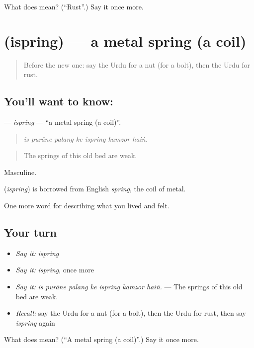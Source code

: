 \begin{tcolorbox}[breakable,colback=teal!4,colframe=teal!35!black,title={Before you move on}]
What does  mean? (\textquotedblleft{}Rust\textquotedblright{}.) Say it once more.
\end{tcolorbox}
\section[\texorpdfstring{\ur{اسپرنگ} (ispring)}{اسپرنگ (ispring)}]{ (ispring) — a metal spring (a coil)}

\label{lesson:UR-C502-ispring}



\begin{quote}
Before the new one: say the Urdu for a nut (for a bolt), then the Urdu for rust.
\end{quote}

\subsection*{You'll want to know: }
\textbf{} — \emph{ispring} — \textquotedblleft{}a metal spring (a coil)\textquotedblright{}.

\begin{quote}
      
\end{quote}

\begin{quote}
\emph{is purāne palang ke ispring kamzor haiṅ.}
\end{quote}

\begin{quote}
The springs of this old bed are weak.
\end{quote}

Masculine.

\begin{cousinweb}
\textbf{} (\emph{ispring}) is borrowed from English \emph{spring}, the coil of metal.
\end{cousinweb}

\begin{grammarlens}[title={What you've built}]
One more word for describing what you lived and felt.
\end{grammarlens}

\subsection*{Your turn}
\begin{itemize}
\raggedright
  \item \emph{Say it:} \emph{ispring}
  \item \emph{Say it:} \emph{ispring}, once more
  \item \emph{Say it:} \emph{is purāne palang ke ispring kamzor haiṅ.} — The springs of this old bed are weak.
  \item \emph{Recall:} say the Urdu for a nut (for a bolt), then the Urdu for rust, then say \emph{ispring} again
\end{itemize}

\begin{tcolorbox}[breakable,colback=teal!4,colframe=teal!35!black,title={Before you move on}]
What does  mean? (\textquotedblleft{}A metal spring (a coil)\textquotedblright{}.) Say it once more.
\end{tcolorbox}
